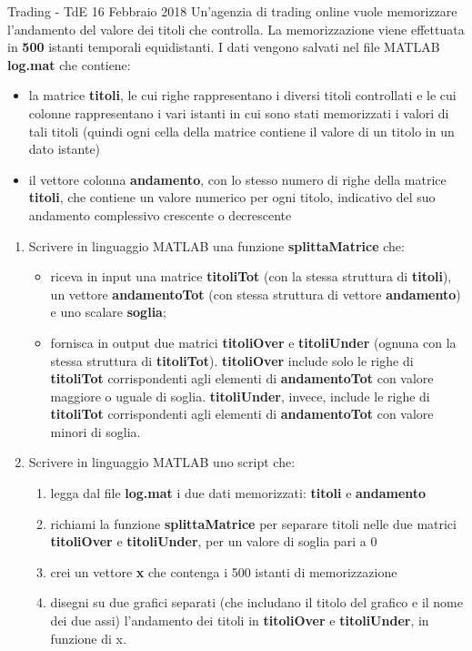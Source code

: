 \documentclass[format=169, 10pt]{beamer}
\begin{document}
\begin{frame}[allowframebreaks]{Trading - TdE 16 Febbraio 2018}
Un’agenzia di trading online vuole memorizzare l’andamento del valore dei titoli che controlla.
La memorizzazione viene effettuata in \textbf{500} istanti temporali equidistanti.
I dati vengono salvati nel file MATLAB \textbf{log.mat} che contiene:
\begin{itemize}
\item la matrice \textbf{titoli}, le cui righe rappresentano i diversi titoli controllati e le cui colonne rappresentano i vari istanti in cui sono stati memorizzati i valori di tali titoli (quindi ogni cella della matrice contiene il valore di un titolo in un dato istante)
\item il vettore colonna \textbf{andamento}, con lo stesso numero di righe della matrice \textbf{titoli}, che contiene un valore numerico per ogni titolo, indicativo del suo andamento complessivo crescente o decrescente
\end{itemize}

\framebreak
\begin{enumerate}
\item Scrivere in linguaggio MATLAB una funzione \textbf{splittaMatrice} che:
\begin{itemize}
	\item riceva in input una matrice \textbf{titoliTot} (con la stessa struttura di \textbf{titoli}), un vettore \textbf{andamentoTot} (con stessa struttura di vettore \textbf{andamento}) e uno scalare \textbf{soglia};
	\item fornisca in output due matrici \textbf{titoliOver} e \textbf{titoliUnder} (ognuna con la stessa struttura di \textbf{titoliTot}). \textbf{titoliOver} include solo le righe di \textbf{titoliTot} corrispondenti agli elementi di \textbf{andamentoTot} con valore maggiore o uguale di soglia. \textbf{titoliUnder}, invece, include le righe di \textbf{titoliTot} corrispondenti agli elementi di \textbf{andamentoTot} con valore minori di soglia.
\end{itemize}

\framebreak
\item Scrivere in linguaggio MATLAB uno script che:
\begin{enumerate}
	\item legga dal file \textbf{log.mat} i due dati memorizzati: \textbf{titoli} e \textbf{andamento}
	\item richiami la funzione \textbf{splittaMatrice} per separare titoli nelle due matrici \textbf{titoliOver} e \textbf{titoliUnder}, per un valore di soglia pari a 0
	\item crei un vettore \textbf{x} che contenga i 500 istanti di memorizzazione 
	\item disegni su due grafici separati (che includano il titolo del grafico e il nome dei due assi) l’andamento dei titoli in \textbf{titoliOver} e \textbf{titoliUnder}, in funzione di x.
\end{enumerate}
\end{enumerate}
\end{frame}
\end{document}
